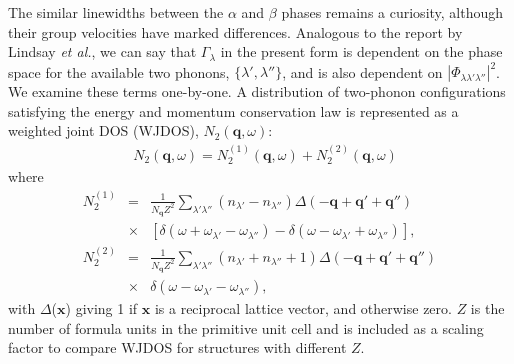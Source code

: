 \documentclass[twocolumn,amsmath,amssymb,a4paper,prb,superscriptaddress,floatfix]{revtex4-1}
\begin{document}
The similar linewidths between the $\alpha$ and
$\beta$ phases remains a curiosity, although their group velocities have marked differences.
Analogous to the report by Lindsay {\it et al.}\cite{Lindsay}, we can say that
$\Gamma_\lambda$ in the present form is dependent on the phase space for the
available two phonons, $\{\lambda', \lambda''\}$, and is also dependent on
$|\Phi_{\lambda\lambda'\lambda''}|^2$. We examine these terms one-by-one. A
distribution of two-phonon configurations satisfying the energy and momentum
conservation law is represented as a weighted joint DOS
(WJDOS)\cite{phono3py},
${N_2(\mathbf{q},\omega)}$:  
\begin{align}
 \label{eq:jdos}
 &N_2(\mathbf{q},\omega) = N_2^{(1)}(\mathbf{q},\omega) +  N_2^{(2)}(\mathbf{q},\omega)
\end{align}
where 
\begin{eqnarray*}
	N_2^{(1)} & = & \frac{1}{N_\mathbf{q}Z^2} \sum_{\lambda'\lambda''}(n_{\lambda'}-n_{\lambda''})\Delta(-\mathbf{q} + \mathbf{q'} + \mathbf{q''}) \nonumber \\
								   & \times & [\delta(\omega + \omega_{\lambda'} - \omega_{\lambda''}) - \delta(\omega - \omega_{\lambda'} + \omega_{\lambda''})],\\
	N_2^{(2)} & = & \frac{1}{N_\mathbf{q}Z^2} \sum_{\lambda'\lambda''}(n_{\lambda'} + n_{\lambda''}+1)\Delta(-\mathbf{q} + \mathbf{q'} + \mathbf{q''}) \nonumber \\
								   & \times & \delta(\omega - \omega_{\lambda'} - \omega_{\lambda''}),
\end{eqnarray*}
with $\Delta$($\mathbf{x}$) giving 1 if $\mathbf{x}$ is a reciprocal lattice
vector, and otherwise zero. $Z$ is the number of formula units in the primitive unit cell
and is included as a scaling factor to compare WJDOS for structures with different
$Z$. 
\end{document}
